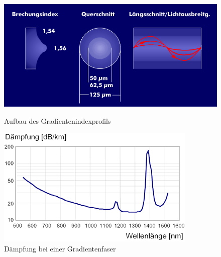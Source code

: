 \begin{figure}[h]
    \begin{center}
        \begin{minipage}[t]{0.4\textwidth}
            \begin{center}
                \includegraphics[height=0.1\textheight]{Bilder/Optische_Wellenleiter_Die_Polymer_Optische_Faser/Brechzahlprofile/pofgi.png}
                \caption[Aufbau des Gradientenindexprofils \newline \url{ITWissen}]{Aufbau des Gradientenindexprofils}
                \label{fig:pofgi}
            \end{center}
        \end{minipage}
        \hspace{0.025\textwidth}
        \begin{minipage}[t]{0.4\textwidth}
            \begin{center}
                \includegraphics[height=0.1\textheight]{Bilder/Optische_Wellenleiter_Die_Polymer_Optische_Faser/Brechzahlprofile/pofgidaempfung.png}
                \caption[Dämpfung bei einer Gradientenfaser \newline \url{POFAC}]{Dämpfung bei einer Gradientenfaser}
                \label{fig:pofgidaempfung}
            \end{center}
        \end{minipage}
    \end{center}
\end{figure}

